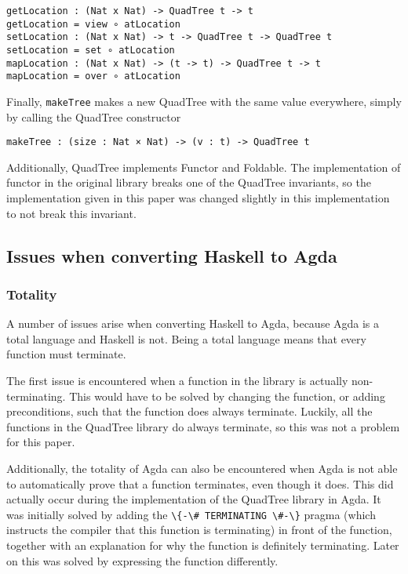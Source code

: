 \begin{verbatim}
getLocation : (Nat x Nat) -> QuadTree t -> t
getLocation = view ∘ atLocation
setLocation : (Nat x Nat) -> t -> QuadTree t -> QuadTree t
setLocation = set ∘ atLocation
mapLocation : (Nat x Nat) -> (t -> t) -> QuadTree t -> t
mapLocation = over ∘ atLocation
\end{verbatim}
Finally,  \verb|makeTree| makes a new QuadTree with the same value everywhere, simply by calling the QuadTree constructor
\begin{verbatim}
makeTree : (size : Nat × Nat) -> (v : t) -> QuadTree t
\end{verbatim}

Additionally, QuadTree implements Functor and Foldable. The implementation of functor in the original library breaks one of the QuadTree invariants, so the implementation given in this paper was changed slightly in this implementation to not break this invariant.

\label{total-functions}
\subsection{Issues when converting Haskell to Agda}
\subsubsection{Totality}
A number of issues arise when converting Haskell to Agda, because Agda is a total language and Haskell is not. Being a total language means that every function must terminate. 

The first issue is encountered when a function in the library is actually non-terminating. This would have to be solved by changing the function, or adding preconditions, such that the function does always terminate. Luckily, all the functions in the QuadTree library do always terminate, so this was not a problem for this paper.

Additionally, the totality of Agda can also be encountered when Agda is not able to automatically prove that a function terminates, even though it does. This did actually occur during the implementation of the QuadTree library in Agda. It was initially solved by adding the \verb|\{-\# TERMINATING \#-\}| pragma (which instructs the compiler that this function is terminating) in front of the function, together with an explanation for why the function is definitely terminating. Later on this was solved by expressing the function differently.

